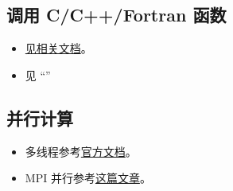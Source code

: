 \subsection{调用 C/C++/Fortran 函数}
\begin{itemize}
\item \href{https://docs.julialang.org/en/v1/manual/calling-c-and-fortran-code/}{见相关文档}。
\item 见 “”
\end{itemize}

\subsection{并行计算}
\begin{itemize}
\item 多线程参考\href{https://docs.julialang.org/en/v1/manual/multi-threading/}{官方文档}。
\item MPI 并行参考\href{http://www.claudiobellei.com/2018/09/30/julia-mpi/}{这篇文章}。
\end{itemize}

